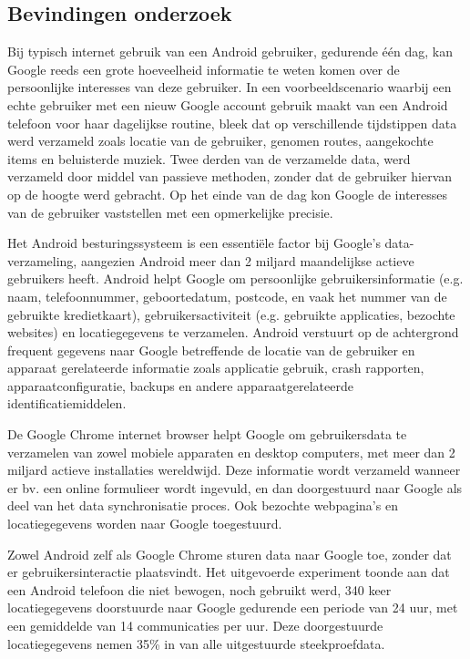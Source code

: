 \subsection{Bevindingen onderzoek}

Bij typisch internet gebruik van een Android gebruiker, gedurende één dag, kan Google reeds een grote hoeveelheid informatie te weten komen over de persoonlijke interesses van deze gebruiker. In een voorbeeldscenario waarbij een echte gebruiker met een nieuw Google account gebruik maakt van een Android telefoon voor haar dagelijkse routine, bleek dat op verschillende tijdstippen data werd verzameld zoals locatie van de gebruiker, genomen routes, aangekochte items en beluisterde muziek. Twee derden van de verzamelde data, werd verzameld door middel van passieve methoden, zonder dat de gebruiker hiervan op de hoogte werd gebracht. Op het einde van de dag kon Google de interesses van de gebruiker vaststellen met een opmerkelijke precisie.

Het Android besturingssysteem is een essentiële factor bij Google's data-verzameling, aangezien Android meer dan 2 miljard maandelijkse actieve gebruikers heeft. Android helpt Google om persoonlijke gebruikersinformatie (e.g. naam, telefoonnummer, geboortedatum, postcode, en vaak het nummer van de gebruikte kredietkaart), gebruikersactiviteit (e.g. gebruikte applicaties, bezochte websites) en locatiegegevens te verzamelen. Android verstuurt op de achtergrond frequent gegevens naar Google betreffende de locatie van de gebruiker en apparaat gerelateerde informatie zoals applicatie gebruik, crash rapporten, apparaatconfiguratie, backups en andere apparaatgerelateerde identificatiemiddelen.

De Google Chrome internet browser helpt Google om gebruikersdata te verzamelen van zowel mobiele apparaten en desktop computers, met meer dan 2 miljard actieve installaties wereldwijd. Deze informatie wordt verzameld wanneer er bv. een online formulieer wordt ingevuld, en dan doorgestuurd naar Google als deel van het data synchronisatie proces. Ook bezochte webpagina's en locatiegegevens worden naar Google toegestuurd.

Zowel Android zelf als Google Chrome sturen data naar Google toe, zonder dat er gebruikersinteractie plaatsvindt. Het uitgevoerde experiment toonde aan dat een Android telefoon die niet bewogen, noch gebruikt werd, 340 keer locatiegegevens doorstuurde naar Google gedurende een periode van 24 uur, met een gemiddelde van 14 communicaties per uur. Deze doorgestuurde locatiegegevens nemen 35\% in van alle uitgestuurde steekproefdata.

